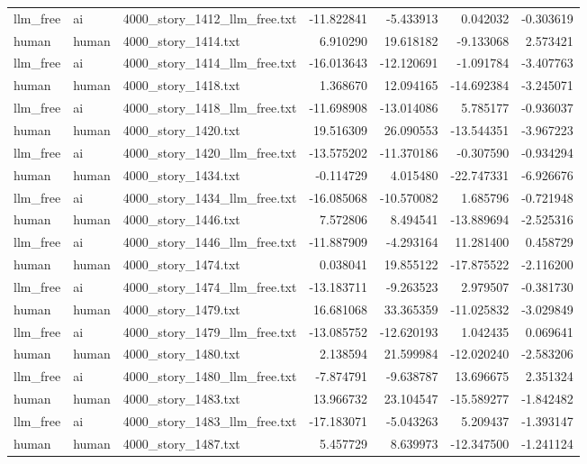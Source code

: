 \begin{longtable}{lllrrrr}
llm\_free & ai & 4000\_story\_1412\_llm\_free.txt & -11.822841 & -5.433913 & 0.042032 & -0.303619 \\
human & human & 4000\_story\_1414.txt & 6.910290 & 19.618182 & -9.133068 & 2.573421 \\
llm\_free & ai & 4000\_story\_1414\_llm\_free.txt & -16.013643 & -12.120691 & -1.091784 & -3.407763 \\
human & human & 4000\_story\_1418.txt & 1.368670 & 12.094165 & -14.692384 & -3.245071 \\
llm\_free & ai & 4000\_story\_1418\_llm\_free.txt & -11.698908 & -13.014086 & 5.785177 & -0.936037 \\
human & human & 4000\_story\_1420.txt & 19.516309 & 26.090553 & -13.544351 & -3.967223 \\
llm\_free & ai & 4000\_story\_1420\_llm\_free.txt & -13.575202 & -11.370186 & -0.307590 & -0.934294 \\
human & human & 4000\_story\_1434.txt & -0.114729 & 4.015480 & -22.747331 & -6.926676 \\
llm\_free & ai & 4000\_story\_1434\_llm\_free.txt & -16.085068 & -10.570082 & 1.685796 & -0.721948 \\
human & human & 4000\_story\_1446.txt & 7.572806 & 8.494541 & -13.889694 & -2.525316 \\
llm\_free & ai & 4000\_story\_1446\_llm\_free.txt & -11.887909 & -4.293164 & 11.281400 & 0.458729 \\
human & human & 4000\_story\_1474.txt & 0.038041 & 19.855122 & -17.875522 & -2.116200 \\
llm\_free & ai & 4000\_story\_1474\_llm\_free.txt & -13.183711 & -9.263523 & 2.979507 & -0.381730 \\
human & human & 4000\_story\_1479.txt & 16.681068 & 33.365359 & -11.025832 & -3.029849 \\
llm\_free & ai & 4000\_story\_1479\_llm\_free.txt & -13.085752 & -12.620193 & 1.042435 & 0.069641 \\
human & human & 4000\_story\_1480.txt & 2.138594 & 21.599984 & -12.020240 & -2.583206 \\
llm\_free & ai & 4000\_story\_1480\_llm\_free.txt & -7.874791 & -9.638787 & 13.696675 & 2.351324 \\
human & human & 4000\_story\_1483.txt & 13.966732 & 23.104547 & -15.589277 & -1.842482 \\
llm\_free & ai & 4000\_story\_1483\_llm\_free.txt & -17.183071 & -5.043263 & 5.209437 & -1.393147 \\
human & human & 4000\_story\_1487.txt & 5.457729 & 8.639973 & -12.347500 & -1.241124 \\

\end{longtable}
